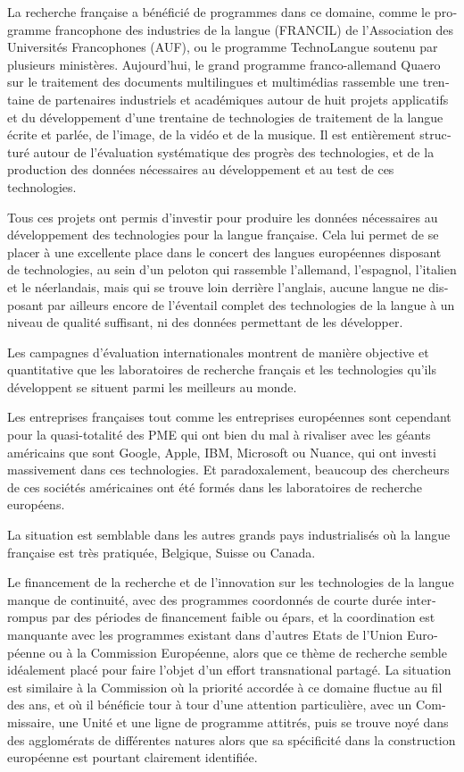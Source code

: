 \begin{french}
\begin{multicols}{2}
La recherche française a bénéficié de programmes dans ce domaine, comme le programme francophone des industries de la langue (FRANCIL) de l’Association des Universités Francophones (AUF), ou le programme TechnoLangue soutenu par plusieurs ministères. Aujourd’hui, le grand programme franco-allemand Quaero sur le traitement des documents multilingues et multimédias rassemble une trentaine de partenaires industriels et académiques autour de huit projets applicatifs et du développement d’une trentaine de technologies de traitement de la langue écrite et parlée, de l’image, de la vidéo et de la musique. Il est entièrement structuré autour de l’évaluation systématique des progrès des technologies, et de la production des données nécessaires au développement et au test de ces technologies.

Tous ces projets ont permis d’investir pour produire les données nécessaires au développement des technologies pour la langue française. Cela lui permet de se placer à une excellente place dans le concert des langues européennes disposant de technologies, au sein d’un peloton qui rassemble l’allemand, l’espagnol, l’italien et le néerlandais, mais qui se trouve loin derrière l’anglais, aucune langue ne disposant par ailleurs encore de l’éventail complet des technologies de la langue à un niveau de qualité suffisant, ni des données permettant de les développer.

Les campagnes d’évaluation internationales montrent de manière objective et quantitative que les laboratoires de recherche français et les technologies qu’ils développent se situent parmi les meilleurs au monde.

Les entreprises françaises tout comme les entreprises européennes sont cependant pour la quasi-totalité des PME qui ont bien du mal à rivaliser avec les géants américains que sont Google, Apple, IBM, Microsoft ou Nuance, qui ont investi massivement dans ces technologies. Et paradoxalement, beaucoup des chercheurs de ces sociétés américaines ont été formés dans les laboratoires de recherche européens.

La situation est semblable dans les autres grands pays industrialisés où la langue française est très pratiquée, Belgique, Suisse ou Canada.

Le financement de la recherche et de l’innovation sur les technologies de la langue manque de continuité, avec des programmes coordonnés de courte durée interrompus par des périodes de financement faible ou épars, et la coordination est manquante avec les programmes existant dans d'autres Etats de l'Union Européenne ou à la Commission Européenne, alors que ce thème de recherche semble idéalement placé pour faire l’objet d’un effort transnational partagé. La situation est similaire à la Commission où la priorité accordée à ce domaine fluctue au fil des ans, et où il bénéficie tour à tour d’une attention particulière, avec un Commissaire, une Unité et une ligne de programme attitrés, puis se trouve noyé dans des agglomérats de différentes natures alors que sa spécificité dans la construction européenne est pourtant clairement identifiée.


\end{multicols}
\end{french}
